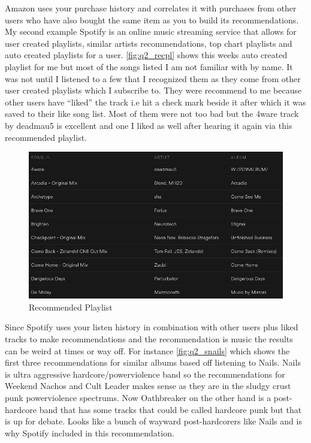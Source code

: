 \documentclass[11pt]{article}
\begin{document}
\noindent Amazon uses your purchase history and correlates it with purchases from other users who have also bought the same item as you to build its recommendations. My second example Spotify is an online music streaming service that allows for user created playlists, similar artists recommendations, top chart playlists and auto created playlists for a user.  \autoref{fig:q2_recpl} shows this weeks auto created playlist for me but most of the songs listed I am not familiar with by name. It was not until I listened to a few that I recognized them as they come from other user created playlists which I subscribe to. They were recommend to me because other users have \enquote{liked} the track i.e hit a check mark beside it after which it was saved to their like song list. Most of them were not too bad but the 4ware track by deadmau5 is excellent and one I liked as well after hearing it again via this recommended playlist.
\begin{figure}[H]
\centering
\includegraphics[scale=.6]{spotify_discover2.png}
   \caption{Recommended Playlist}
          \label{fig:q2_recpl}
\end{figure}
Since Spotify uses your listen history in combination with other users plus liked tracks to make recommendations and the recommendation is music the results can be weird at times or way off. For instance \autoref{fig:q2_snails} which shows the first three recommendations for similar albums based off listening to Nails. Nails is ultra aggressive hardcore/powerviolence band so the recommendations for Weekend Nachos and Cult Leader makes sense as they are in the sludgy crust punk powerviolence spectrums. Now Oathbreaker on the other hand is a post-hardcore band that has some tracks that could be called hardcore punk but that is up for debate. Looks like a bunch of wayward post-hardcorers like Nails and is why Spotify included in this recommendation.
\end{document}
